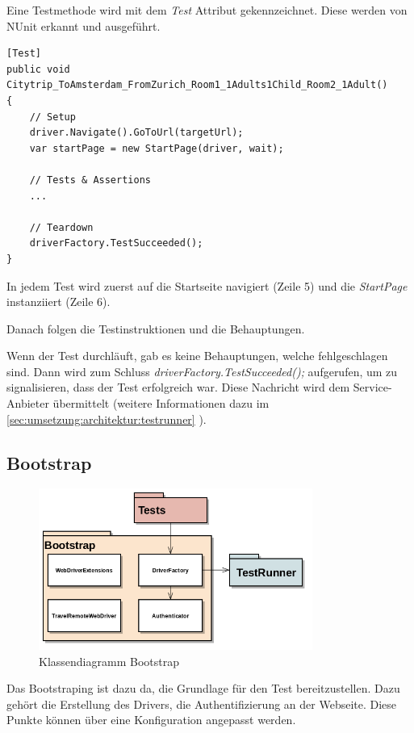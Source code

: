 Eine Testmethode wird mit dem \textit{Test} Attribut gekennzeichnet. Diese werden von NUnit erkannt und ausgeführt.

\begin{lstlisting}
[Test]
public void Citytrip_ToAmsterdam_FromZurich_Room1_1Adults1Child_Room2_1Adult()
{
	// Setup
	driver.Navigate().GoToUrl(targetUrl);
	var startPage = new StartPage(driver, wait);
	
	// Tests & Assertions
	...
	
	// Teardown
	driverFactory.TestSucceeded();
}
\end{lstlisting}

In jedem Test wird zuerst auf die Startseite navigiert (Zeile 5) und die \textit{StartPage} instanziiert (Zeile 6).

Danach folgen die Testinstruktionen und die Behauptungen.

Wenn der Test durchläuft, gab es keine Behauptungen, welche fehlgeschlagen sind. Dann wird zum Schluss \textit{driverFactory.TestSucceeded();} aufgerufen, um zu signalisieren, dass der Test erfolgreich war. Diese Nachricht wird dem Service-Anbieter übermittelt (weitere Informationen dazu im \cref{sec:umsetzung:architektur:testrunner} ).

\subsection{Bootstrap}
\label{sec:umsetzung:architektur:bootstrap}
\begin{figure}[H]
	\centering
	\includegraphics[width=0.8\textwidth]{images/semesterarbeit class diagram - bootstrap.png}
	\caption{Klassendiagramm Bootstrap}
	\label{fig:umsetzung:architektur:bootstrap}
\end{figure}
Das Bootstraping ist dazu da, die Grundlage für den Test bereitzustellen. Dazu gehört die Erstellung des Drivers, die Authentifizierung an der Webseite. Diese Punkte können über eine Konfiguration angepasst werden.

